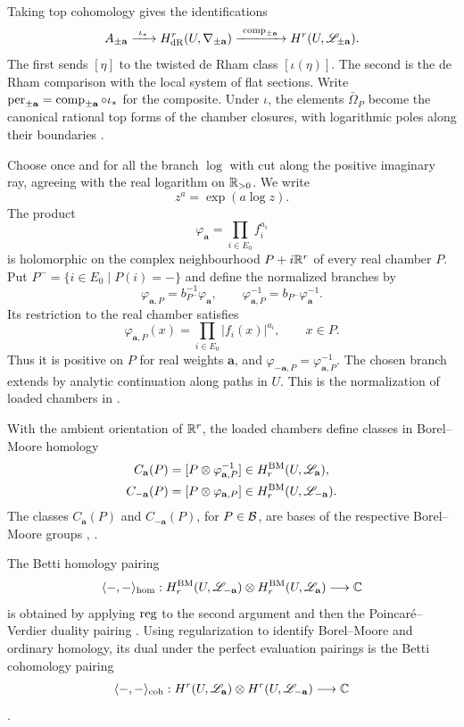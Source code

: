 Taking top cohomology gives the identifications
\[
 A_{\pm\mathbf a}
 \xrightarrow{\ \iota_*\ }H^r_{\mathrm{dR}}(U,\nabla_{\pm\mathbf a})
 \xrightarrow{\ \operatorname{comp}_{\pm\mathbf a}\ }H^r(U,\mathscr L_{\pm\mathbf a}).
\]
The first sends $[\eta]$ to the twisted de Rham class $[\iota(\eta)]$.
The second is the de Rham comparison with the local system of flat
sections.
Write $\operatorname{per}_{\pm\mathbf a}=\operatorname{comp}_{\pm\mathbf a}\circ\iota_*$
for the composite.
Under $\iota$, the elements $\bar\Omega_P$ become the canonical
rational top forms of the chamber closures, with logarithmic poles
along their boundaries \cite[Remark 4.10]{Lam}.

Choose once and for all the branch $\log$ with cut along the positive
imaginary ray, agreeing with the real logarithm on $\mathbb R_{>0}$. We write
\[
 z^a=\exp(a\log z).
\]
The product
\[
 \varphi_{\mathbf a}
 =\prod_{i\in E_0}f_i^{a_i}
\]
is holomorphic on the complex neighbourhood $P+i\mathbb R^r$ of every real
chamber $P$.
Put $P^-=\{i\in E_0\mid P(i)=-\}$ and define the normalized branches by
\begin{equation}\label{eq:loading}
 \varphi_{\mathbf a,P}
 =b_{P^-}^{-1}\varphi_{\mathbf a},\qquad
 \varphi_{\mathbf a,P}^{-1}=b_{P^-}\varphi_{\mathbf a}^{-1}.
\end{equation}
Its restriction to the real chamber satisfies
\[
 \varphi_{\mathbf a,P}(x)=\prod_{i\in E_0}|f_i(x)|^{a_i},
 \qquad x\in P.
\]
Thus it is positive on $P$ for real weights $\mathbf a$, and
$\varphi_{-\mathbf a,P}=\varphi_{\mathbf a,P}^{-1}$.
The chosen branch extends by analytic continuation along paths in $U$.
This is the normalization of loaded chambers in
\cite[Definition 12.6 and equation (12.5)]{Lam}.

With the ambient orientation of $\mathbb R^r$, the loaded chambers define
classes in Borel--Moore homology
\begin{align*}
 C_{\mathbf a}(P)&=[P\otimes\varphi_{\mathbf a,P}^{-1}]
       \in H_r^{\mathrm{BM}}(U,\mathscr L_{\mathbf a}),\\
 C_{-\mathbf a}(P)&=[P\otimes\varphi_{\mathbf a,P}]
       \in H_r^{\mathrm{BM}}(U,\mathscr L_{-\mathbf a}).
\end{align*}
The classes $C_{\mathbf a}(P)$ and $C_{-\mathbf a}(P)$, for $P\in\mathcal B$, are bases
of the respective Borel--Moore groups
\cite{Kohno}, \cite[Proposition 12.7]{Lam}.

The Betti homology pairing
\[
 \langle-,-\rangle_{\mathrm{hom}}:
 H_r^{\mathrm{BM}}(U,\mathscr L_{-\mathbf a})\otimes
 H_r^{\mathrm{BM}}(U,\mathscr L_{\mathbf a})\longrightarrow\mathbb C
\]
is obtained by applying $\operatorname{reg}$ to the second argument and then the
Poincar\'e--Verdier duality pairing \cite[Definition 12.5]{Lam}.
Using regularization to identify Borel--Moore and ordinary homology,
its dual under the perfect evaluation pairings is the Betti
cohomology pairing
\[
 \langle-,-\rangle_{\mathrm{coh}}:
 H^r(U,\mathscr L_{\mathbf a})\otimes H^r(U,\mathscr L_{-\mathbf a})
 \longrightarrow\mathbb C
\]
\cite[equation (12.3) and Section 12.4]{Lam}.

